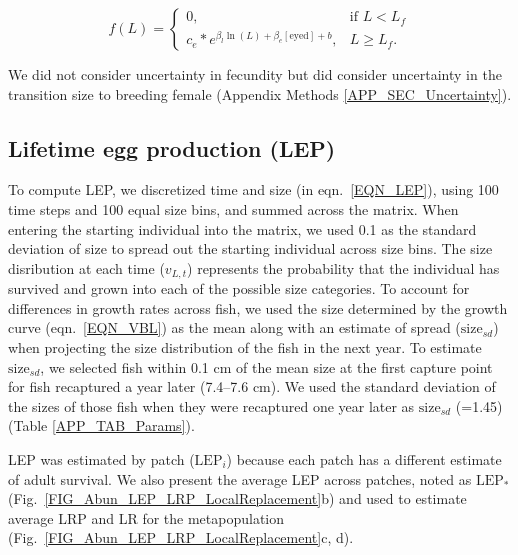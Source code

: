 \documentclass[12pt, oneside]{article}   	%
\begin{document}
\begin{equation}
f(L) = 
\begin{cases}
0, & \text{if } L < L_f \\
c_e * e^{\beta_l\ln(L) + \beta_e[\text{eyed}] + b}, & L \geq L_f. \label{EQN_Fec}
\end{cases}
\end{equation}

We did not consider uncertainty in fecundity but did consider uncertainty in the transition size to breeding female (Appendix Methods \ref{APP_SEC_Uncertainty}).

\subsection{Lifetime egg production (LEP)} \label{APP_SEC_METHODS_LEP}

To compute LEP, we discretized time and size (in eqn.\ \ref{EQN_LEP}), using 100 time steps and 100 equal size bins, and summed across the matrix. When entering the starting individual into the matrix, we used 0.1 as the standard deviation of size to spread out the starting individual across size bins. The size disribution at each time ($v_{L,t}$) represents the probability that the individual has survived and grown into each of the possible size categories. To account for differences in growth rates across fish, we used the size determined by the growth curve (eqn.\ \ref{EQN_VBL}) as the mean along with an estimate of spread ($\text{size}_{sd}$) when projecting the size distribution of the fish in the next year. To estimate $\text{size}_{sd}$, we selected fish within 0.1 cm of the mean size at the first capture point for fish recaptured a year later (7.4--7.6 cm). We used the standard deviation of the sizes of those fish when they were recaptured one year later as $\text{size}_{sd}$ (=1.45) (Table \ref{APP_TAB_Params}). %

LEP was estimated by patch ($\text{LEP}_i$) because each patch has a different estimate of adult survival. We also present the average LEP across patches, noted as $\text{LEP}_*$ (Fig.\ \ref{FIG_Abun_LEP_LRP_LocalReplacement}b) and used to estimate average LRP and LR for the metapopulation (Fig.\ \ref{FIG_Abun_LEP_LRP_LocalReplacement}c, d). 
\end{document}
